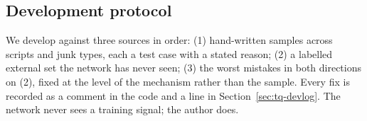 \subsection{Development protocol}
We develop against three sources in order: (1) hand-written samples across
scripts and junk types, each a test case with a stated reason; (2) a labelled
external set the network has never seen; (3) the worst mistakes in both
directions on (2), fixed at the level of the mechanism rather than the sample.
Every fix is recorded as a comment in the code and a line in
Section~\ref{sec:tq-devlog}. The network never sees a training signal; the
author does.
